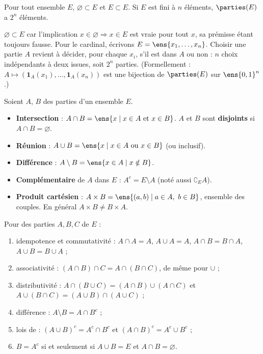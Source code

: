 \begin{proposition}\label{prop-parties}
Pour tout ensemble $E$, $\varnothing\subset E$ et $E\subset E$. Si $E$ est fini à $n$ éléments, $\parties(E)$ a $2^n$ éléments.
\end{proposition}
\begin{preuve}
$\varnothing\subset E$ car l'implication \og $x\in\varnothing\Rightarrow x\in E$ \fg{} est vraie pour tout $x$, sa prémisse étant toujours fausse. Pour le cardinal, écrivons $E=\ens{x_1,\dots,x_n}$. Choisir une partie $A$ revient à décider, pour chaque $x_i$, s'il est dans $A$ ou non : $n$ choix indépendants à deux issues, soit $2^n$ parties. (Formellement : $A\mapsto(\mathbf 1_A(x_1),\dots,\mathbf 1_A(x_n))$ est une bijection de $\parties(E)$ sur $\ens{0,1}^n$.)
\end{preuve}
\begin{definition}[Opérations]
Soient $A$, $B$ des parties d'un ensemble $E$.
\begin{itemize}
\item \textbf{Intersection} : $A\cap B=\ens{x\mid x\in A \text{ et } x\in B}$. $A$ et $B$ sont \textbf{disjoints} si $A\cap B=\varnothing$.
\item \textbf{Réunion} : $A\cup B=\ens{x\mid x\in A \text{ ou } x\in B}$ (\og ou \fg{} inclusif).
\item \textbf{Différence} : $A\setminus B=\ens{x\in A\mid x\notin B}$.
\item \textbf{Complémentaire} de $A$ dans $E$ : $A^c=E\setminus A$ (noté aussi $\complement_E A$).
\item \textbf{Produit cartésien} : $A\times B=\ens{(a,b)\mid a\in A,\ b\in B}$, ensemble des couples. En général $A\times B\neq B\times A$.
\end{itemize}
\end{definition}
\begin{proposition}\label{prop-calcul-ens}
Pour des parties $A,B,C$ de $E$ :
\begin{enumerate}
\item idempotence et commutativité : $A\cap A=A$, $A\cup A=A$, $A\cap B=B\cap A$, $A\cup B=B\cup A$ ;
\item associativité : $(A\cap B)\cap C=A\cap(B\cap C)$, de même pour $\cup$ ;
\item distributivité : $A\cap(B\cup C)=(A\cap B)\cup(A\cap C)$ et $A\cup(B\cap C)=(A\cup B)\cap(A\cup C)$ ;
\item différence : $A\setminus B=A\cap B^c$ ;
\item lois de  : $(A\cup B)^c=A^c\cap B^c$ et $(A\cap B)^c=A^c\cup B^c$ ;
\item $B=A^c$ si et seulement si $A\cup B=E$ et $A\cap B=\varnothing$.
\end{enumerate}
\end{proposition}
